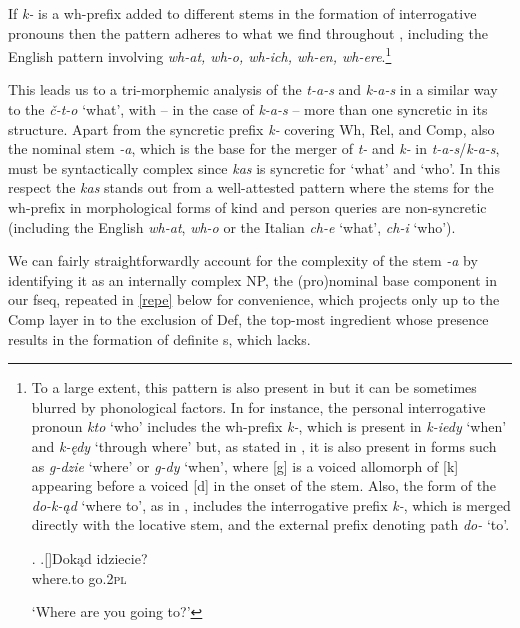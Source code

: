 If \textit{k-} is a wh-prefix added to different stems in the formation of interrogative pronouns then the  pattern adheres to what we find throughout , including the English pattern involving \textit{wh-at, wh-o, wh-ich, wh-en, wh-ere}.\footnote{To a large extent, this pattern is also present in  but it can be sometimes blurred by phonological factors. In  for instance, the personal interrogative pronoun \textit{kto} `who' includes the wh-prefix \textit{k-}, which is present in \textit{k-iedy} `when' and \textit{k-\k{e}dy }`through where' but, as stated in \cite{Wiland-PSiCL}, it is also present in forms such as \textit{g-dzie} `where' or \textit{g-dy} `when', where [g] is a voiced allomorph  of [k] appearing before a voiced [d] in the onset of the stem. Also, the form of the  \textit{do-k-\k{a}d} `where to', as in \Next, includes the interrogative prefix \textit{k-}, which is merged directly with the locative stem, and the external prefix denoting path \textit{do-} `to'.

\ex. 
\ag.[]\hspace{-22pt}Dok\k{a}d idziecie?\\
\hspace{-22pt}where.to go.\textsc{2pl}\\
\hspace{-22pt}\strut `Where are you going to?'


} %
\par
This leads us to a tri-mor\-phe\-mic analysis of the  \textit{t-a-s} and \textit{k-a-s} in a similar way to the  \textit{\v{c}-t-o} `what', with -- in the case of \textit{k-a-s} -- more than one syncretic  in its structure. Apart from the syncretic prefix \textit{k-} covering Wh, Rel, and Comp, also the nominal stem \textit{-a}, which is the base for the merger of \textit{t-} and \textit{k-} in \textit{t-a-s}/\textit{k-a-s}, must be syntactically complex since \textit{kas} is syncretic for `what' and `who'. In this respect the  \textit{kas} stands out from a well-attested pattern where the stems for the wh-prefix in morphological forms of kind and person queries are non-syncretic (including the English \textit{wh-at}, \textit{wh-o} or the Italian \textit{ch-e} `what', \textit{ch-i} `who'). 
\par
We can fairly straightforwardly account for the complexity of the  stem \textit{-a} by identifying it as an internally complex NP, the (pro)nominal base component in our fseq, repeated in \ref{repe} below for convenience, which projects only up to the Comp layer in  to the exclusion of Def, the top-most ingredient whose presence results in the formation of definite s, which  lacks.

